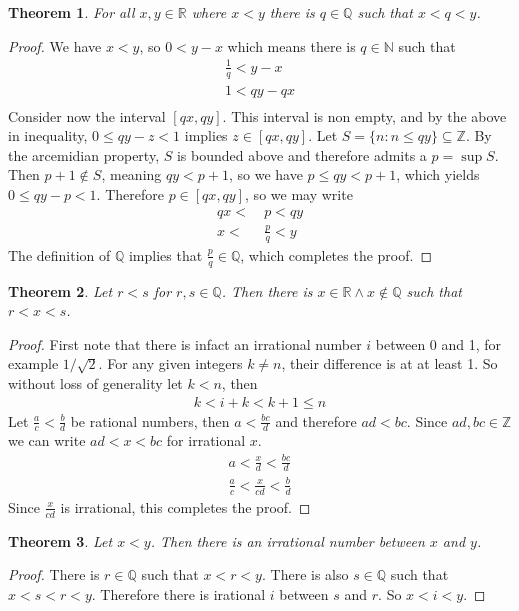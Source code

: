 \documentclass{article}
\newtheorem{theorem}{Theorem}[section]
\begin{document}
\begin{theorem}
	For all $x,y \in \mathbb{R}$ where $x < y$ there is $q \in \mathbb{Q}$ such
	that $x < q < y$.
\end{theorem}
\begin{proof}
	We have $x < y$, so $0 < y -x$ which means there is $q \in \mathbb{N}$ such
	that 
	\begin{align*}
		\frac{1}{q} < y -x \\
		1 < qy - qx \\
	\end{align*}
	Consider now the interval $[qx,qy]$. This interval is non empty, and by
	the above in inequality, $0 \leq qy-z<1$ implies $z \in [qx,qy]$. Let $S = 
	\{n:n \leq qy\} \subseteq \mathbb{Z}$. By the arcemidian property, $S$ is
	bounded above and therefore admits a $p = \sup S$. Then $p+1 \notin S$,
	meaning $qy < p+1$, so we have $p \leq qy < p+1$, which yields $0 \leq qy-p
	< 1$. Therefore $p\in [qx,qy]$, so we may write
	\begin{align*}
		qx <&\ p < qy \\
		x <&\ \frac{p}{q} < y
	\end{align*}
	The definition of $\mathbb{Q}$ implies that $\frac{p}{q} \in \mathbb{Q}$,
	which completes the proof.
\end{proof}
\begin{theorem}
	Let $r<s$ for $r,s \in \mathbb{Q}$. Then there is $x\in \mathbb{R} \land x
	\notin \mathbb{Q}$ such that $r<x<s$.
\end{theorem}
\begin{proof}
	First note that there is infact an irrational number $i$ between 0 and 1, 
	for example $1/\sqrt{2}$. For any given integers $k\neq n$, their
	difference is at at least 1. So without loss of generality let $k<n$, then
	\begin{align*}
		k < i+k < k+1 \leq n
	\end{align*}
	Let $\frac{a}{c}< \frac{b}{d}$ be rational numbers, then $a < \frac{bc}{d}$ 
	and therefore $ad < bc$. Since $ad,bc \in \mathbb{Z}$ we can write 
	$ad < x < bc$ for irrational $x$. 
	\begin{align*}
		a < \frac{x}{d} < \frac{bc}{d} \\
		\frac{a}{c} < \frac{x}{cd} < \frac{b}{d}
	\end{align*}
	Since $\frac{x}{cd}$ is irrational, this completes the proof.
\end{proof}
\begin{theorem}
	Let $x<y$. Then there is an irrational number between $x$ and $y$.
\end{theorem}
\begin{proof}
	There is $r \in \mathbb{Q}$ such that $x<r<y$. There is also $s\in
	\mathbb{Q}$ such that $x<s<r<y$. Therefore there is irational $i$ between
	$s$ and $r$. So $x<i<y$.
\end{proof}
\end{document}
